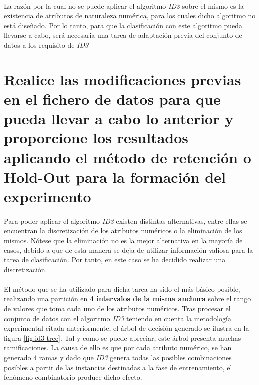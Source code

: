 \documentclass[10pt, a4paper,spanish]{article}
\begin{document}
		\paragraph{}
		La razón por la cual no se puede aplicar el algoritmo \emph{ID3} sobre el mismo es la existencia de atributos de naturaleza numérica, para los cuales dicho algoritmo no está diseñado. Por lo tanto, para que la clasificación con este algoritmo pueda llevarse a cabo, será necesaria una tarea de adaptación previa del conjunto de datos a los requisito de \emph{ID3}

	\section{Realice las modificaciones previas en el fichero de datos para que pueda llevar a cabo lo anterior y proporcione los resultados aplicando el método de retención o Hold-Out para la formación del experimento}
	\label{sec:2}

		\paragraph{}
		Para poder aplicar el algoritmo \emph{ID3} existen distintas alternativas, entre ellas se encuentran la discretización de los atributos numéricos o la eliminación de los mismos. Nótese que la eliminación no es la mejor alternativa en la mayoría de casos, debido a que de esta manera se deja de utilizar información valiosa para la tarea de clasificación. Por tanto, en este caso se ha decidido realizar una discretización.

		\paragraph{}
		El método que se ha utilizado para dicha tarea ha sido el más básico posible, realizando una partición en \textbf{4 intervalos de la misma anchura} sobre el rango de valores que toma cada uno de los atributos numéricos. Tras procesar el conjunto de datos con el algoritmo \emph{ID3} teniendo en cuenta la metodología experimental citada anteriormente, el árbol de decisión generado se ilustra en la figura \ref{fig:id3-tree}. Tal y como se puede apreciar, este árbol presenta muchas ramificaciones. La causa de ello es que por cada atributo numérico, se han generado 4 ramas y dado que \emph{ID3} genera todas las posibles combinaciones posibles a partir de las instancias destinadas a la fase de entrenamiento, el fenómeno combinatorio produce dicho efecto.
\end{document}
